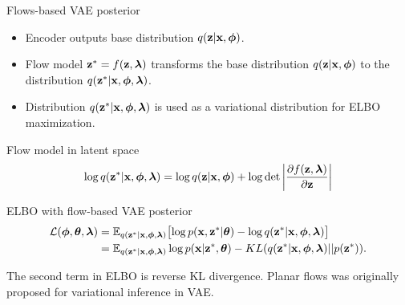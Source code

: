 \begin{frame}{Flows-based VAE posterior}
	\begin{itemize}
		\item Encoder outputs base distribution $q(\mathbf{z} | \mathbf{x}, \boldsymbol{\phi})$.
		\item Flow model $\mathbf{z}^* = f(\mathbf{z}, \boldsymbol{\lambda})$ transforms the base distribution $q(\mathbf{z} | \mathbf{x}, \boldsymbol{\phi})$ to the distribution $q(\mathbf{z}^* | \mathbf{x}, \boldsymbol{\phi}, \boldsymbol{\lambda})$.
		\item Distribution $q(\mathbf{z}^* | \mathbf{x}, \boldsymbol{\phi}, \boldsymbol{\lambda})$ is used as a variational distribution for ELBO maximization.
	\end{itemize}
	
	\begin{block}{Flow model in latent space}
		\vspace{-0.3cm}
		\[
			\log q(\mathbf{z}^* | \mathbf{x}, \boldsymbol{\phi}, \boldsymbol{\lambda}) = \log q(\mathbf{z} | \mathbf{x}, \boldsymbol{\phi}) + \log \det \left | \frac{\partial f(\mathbf{z}, \boldsymbol{\lambda})}{\partial \mathbf{z}}\right|
		\]
		\vspace{-0.3cm}
	\end{block}
	\begin{block}{ELBO with flow-based VAE posterior}
		\vspace{-0.5cm}
		\begin{align*}
			\mathcal{L} (\boldsymbol{\phi}, \boldsymbol{\theta}, \boldsymbol{\lambda})  
			&= \mathbb{E}_{q(\mathbf{z}^* | \mathbf{x}, \boldsymbol{\phi}, \boldsymbol{\lambda})} \bigl[\log p(\mathbf{x}, \mathbf{z}^* | \boldsymbol{\theta}) - \log q(\mathbf{z}^*| \mathbf{x}, \boldsymbol{\phi}, \boldsymbol{\lambda}) \bigr] \\ 
			&=  \mathbb{E}_{q(\mathbf{z}^* | \mathbf{x}, \boldsymbol{\phi}, \boldsymbol{\lambda})} \log p(\mathbf{x} | \mathbf{z}^*, \boldsymbol{\theta}) - KL (q(\mathbf{z}^* | \mathbf{x}, \boldsymbol{\phi}, \boldsymbol{\lambda}) || p(\mathbf{z}^*)).
		\end{align*}
		\vspace{-0.4cm}
	\end{block}
	The second term in ELBO is reverse KL divergence. Planar flows was originally proposed for variational inference in VAE.
	
\end{frame}
